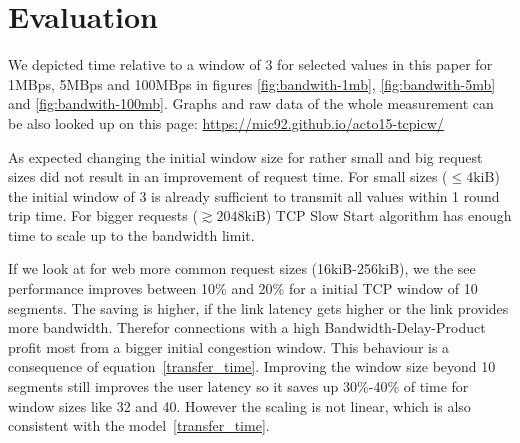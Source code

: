 \section{Evaluation}
\label{sec:evaluation}

We depicted time relative to a window of 3 for selected values in this paper for
1MBps, 5MBps and 100MBps in figures \ref{fig:bandwith-1mb},
\ref{fig:bandwith-5mb} and \ref{fig:bandwith-100mb}. Graphs and raw data of the
whole measurement can be also looked up on this page:
\url{https://mic92.github.io/acto15-tcpicw/}

As expected changing the initial window size for rather small and big request
sizes did not result in an improvement of request time. For small sizes
($\leq{}4\text{kiB}$) the initial window of 3 is already sufficient to transmit
all values within 1 round trip time. For bigger requests
($\gtrsim{}2048\text{kiB}$) TCP Slow Start algorithm has enough time to scale up
to the bandwidth limit.

If we look at for web more common request sizes (16kiB-256kiB), we the see
performance improves between 10\% and 20\% for a initial TCP window of 10
segments. The saving is higher, if the link latency gets higher or the link
provides more bandwidth. Therefor connections with a high Bandwidth-Delay-Product
profit most from a bigger initial congestion window. This behaviour is a
consequence of equation~\ref{transfer_time}. Improving the window size beyond 10
segments still improves the user latency so it saves up 30\%-40\% of time for
window sizes like 32 and 40. However the scaling is not linear, which is also
consistent with the model~\ref{transfer_time}.
